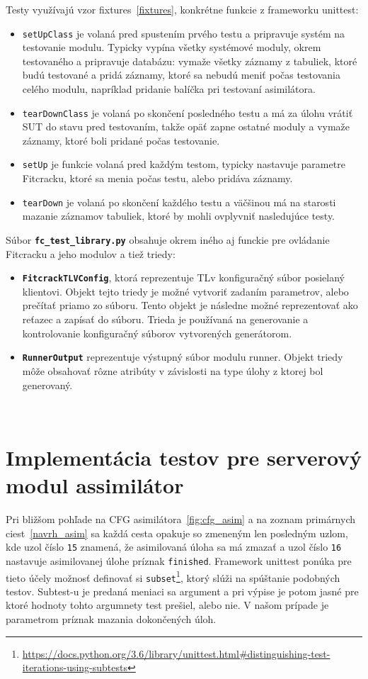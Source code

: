 Testy využívajú vzor fixtures~\ref{fixtures}, konkrétne funkcie z frameworku unittest:
\begin{itemize}
	\item \texttt{setUpClass} je volaná pred spustením prvého testu a pripravuje systém na testovanie modulu.
		Typicky vypína všetky systémové moduly, okrem testovaného a pripravuje databázu: vymaže všetky záznamy z tabuliek, ktoré budú testované a pridá záznamy, ktoré sa nebudú meniť počas testovania celého modulu, napríklad pridanie balíčka pri testovaní asimilátora.
	\item \texttt{tearDownClass}  je volaná po skončení posledného testu a má za úlohu vrátiť SUT do stavu pred testovaním, takže opäť zapne ostatné moduly a vymaže záznamy, ktoré boli pridané počas testovanie.
	\item \texttt{setUp} je funkcie volaná pred každým testom, typicky nastavuje parametre Fitcracku, ktoré sa menia počas testu, alebo pridáva záznamy.
	\item \texttt{tearDown} je volaná po skončení každého testu a väčšinou má na starosti mazanie záznamov tabuliek, ktoré by mohli ovplyvniť nasledujúce testy.
\end{itemize}

Súbor \textbf{\texttt{fc\_test\_library.py}} obsahuje okrem iného aj funckie pre ovládanie Fitcracku a jeho modulov a tiež triedy:
\begin{itemize}
	\item \textbf{\texttt{FitcrackTLVConfig}}, ktorá reprezentuje TLv konfiguračný súbor posielaný klientovi. 
		Objekt tejto triedy je možné vytvoriť zadaním parametrov, alebo prečítať priamo zo súboru.
		Tento objekt je následne možné reprezentovať ako reťazec a zapísať do súboru.
		Trieda je používaná na generovanie a kontrolovanie konfiguračný súborov vytvorených generátorom.
	\item \textbf{\texttt{RunnerOutput}} reprezentuje výstupný súbor modulu runner. Objekt triedy môže obsahovať rôzne atribúty v závislosti na type úlohy z ktorej bol generovaný.
\end{itemize}

 \\

\section{Implementácia testov pre serverový modul assimilátor}
Pri bližšom pohľade na CFG asimilátora~\ref{fig:cfg_asim} a na zoznam primárnych ciest~\ref{navrh_asim} sa každá cesta opakuje so zmeneným len posledným uzlom, kde uzol číslo \texttt{15} znamená, že asimilovaná úloha sa má zmazať a uzol číslo \texttt{16} nastavuje asimilovanej úlohe príznak \texttt{finished}.
Framework unittest ponúka pre tieto účely možnosť definovať si \texttt{subset}\footnote{\url{https://docs.python.org/3.6/library/unittest.html\#distinguishing-test-iterations-using-subtests}}, ktorý slúži na spúštanie podobných testov.
Subtest-u je predaná meniaci sa argument a pri výpise je potom jasné pre ktoré hodnoty tohto argumnety test prešiel, alebo nie.
V našom prípade je parametrom príznak mazania dokončených úloh.

